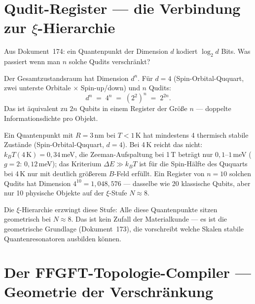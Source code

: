 
\section{Qudit-Register --- die Verbindung zur \texorpdfstring{$\xi$}{xi}-Hierarchie}
\label{sec:qudit-register}

Aus Dokument~174: ein Quantenpunkt der Dimension $d$
kodiert $\log_2 d$ Bits.
Was passiert wenn man $n$ solche Qudits verschränkt?

Der Gesamtzustandsraum hat Dimension $d^n$.
Für $d = 4$ (Spin-Orbital-Ququart, zwei unterste Orbitale
$\times$ Spin-up/down) und $n$ Qudits:
\begin{equation}
  d^n \;=\; 4^n \;=\; (2^2)^n \;=\; 2^{2n}.
\end{equation}
Das ist äquivalent zu $2n$ Qubits in einem Register
der Größe $n$ --- doppelte Informationsdichte pro Objekt.

\begin{keyresult}
Ein Quantenpunkt mit $R = 3$\,nm bei $T < 1$\,K
hat mindestens 4 thermisch stabile Zustände
(Spin-Orbital-Ququart, $d = 4$).
Bei 4\,K reicht das nicht: $k_BT(4\,\text{K}) = 0{,}34$\,meV, die Zeeman-Aufspaltung bei 1\,T beträgt nur $0{,}1$--$1$\,meV ($g = 2$: $0{,}12$\,meV); das Kriterium $\Delta E \gg k_BT$ ist für die Spin-Hälfte des Ququarts bei 4\,K nur mit deutlich größerem $B$-Feld erfüllt.
Ein Register von $n = 10$ solchen Qudits
hat Dimension $4^{10} = 1{,}048{,}576$ ---
dasselbe wie 20 klassische Qubits, aber
nur 10 physische Objekte auf der $\xi$-Stufe $N \approx 8$.

Die $\xi$-Hierarchie erzwingt diese Stufe:
Alle diese Quantenpunkte sitzen geometrisch
bei $N \approx 8$. Das ist kein Zufall der
Materialkunde --- es ist die geometrische Grundlage
(Dokument~173), die vorschreibt welche Skalen
stabile Quantenresonatoren ausbilden können.
\end{keyresult}

\section{Der FFGFT-Topologie-Compiler --- Geometrie der Verschränkung}
\label{sec:compiler}

